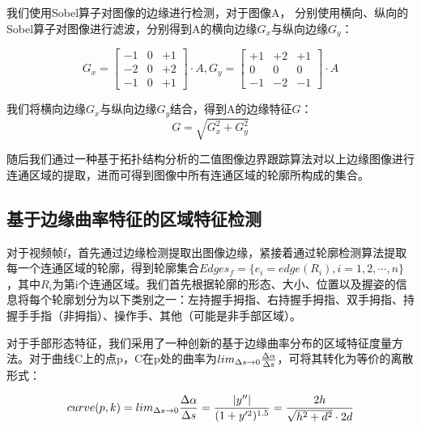 我们使用Sobel算子对图像的边缘进行检测，对于图像A，  分别使用横向、纵向的Sobel算子对图像进行滤波，分别得到A的横向边缘$G_x$与纵向边缘$G_y$：

\begin{equation}
    G_x = \left[
    \begin{matrix}
        -1 & 0 & +1 \\
        -2 & 0 & +2 \\
        -1 & 0 & +1
    \end{matrix}
    \right] \cdot A,
    G_y = \left[
    \begin{matrix}
        +1 & +2 & +1 \\
        0 & 0 & 0 \\
        -1 & -2 & -1
    \end{matrix}
    \right] \cdot A
\end{equation}

我们将横向边缘$G_x$与纵向边缘$G_y$结合，得到A的边缘特征$G$：
$$G=\sqrt{G_x^2 + G_y^2}$$

随后我们通过一种基于拓扑结构分析的二值图像边界跟踪算法\cite{Suzuki1984}对以上边缘图像进行连通区域的提取，进而可得到图像中所有连通区域的轮廓所构成的集合。

\subsection{基于边缘曲率特征的区域特征检测}

对于视频帧f，首先通过边缘检测提取出图像边缘，紧接着通过轮廓检测算法提取每一个连通区域的轮廓，得到轮廓集合$Edges_f = \{e_i = edge(R_i), i=1,2,\cdots,n\}$，其中$R_i$为第i个连通区域。我们首先根据轮廓的形态、大小、位置以及握姿的信息将每个轮廓划分为以下类别之一：左持握手拇指、右持握手拇指、双手拇指、持握手手指（非拇指）、操作手、其他（可能是非手部区域）。

对于手部形态特征，我们采用了一种创新的基于边缘曲率分布的区域特征度量方法。对于曲线C上的点p，C在p处的曲率为$lim_{\Delta s \to 0} {{\Delta \alpha}\over{\Delta s}}$，可将其转化为等价的离散形式：

\begin{equation}
    curve(p,k)=lim_{\Delta s \to 0} {{\Delta \alpha}\over{\Delta s}} = {|y''| \over {(1+y'^2)^{1.5}}} = {2h \over{\sqrt{h^2+d^2}\cdot 2d}}
\end{equation}

